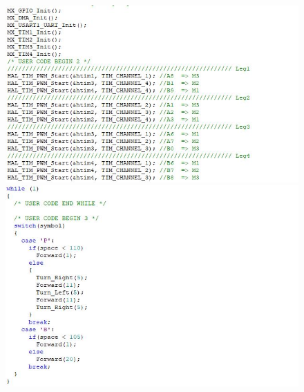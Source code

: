 	\begin{figure}[!h]
	\centering
	\includegraphics[width=\columnwidth]{./Images/Appendix/IMG_3.JPG}
		
	\vspace{0.5cm}
	\includegraphics[width=\columnwidth]{./Images/Appendix/IMG_4.JPG}
	\end{figure}
	
